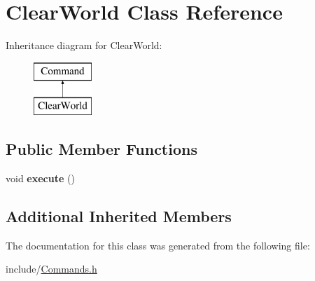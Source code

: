 \hypertarget{classClearWorld}{\section{Clear\-World Class Reference}
\label{classClearWorld}
}
Inheritance diagram for Clear\-World\-:\begin{figure}[H]
\begin{center}
\leavevmode
\includegraphics[height=2.000000cm]{classClearWorld}
\end{center}
\end{figure}
\subsection*{Public Member Functions}
\begin{DoxyCompactItemize}
\item 
\hypertarget{classClearWorld_a41ad61c93dc9eaafe3285a91a9adb637}{void {\bfseries execute} ()}\label{classClearWorld_a41ad61c93dc9eaafe3285a91a9adb637}

\end{DoxyCompactItemize}
\subsection*{Additional Inherited Members}


The documentation for this class was generated from the following file\-:\begin{DoxyCompactItemize}
\item 
include/\hyperlink{Commands_8h}{Commands.\-h}\end{DoxyCompactItemize}

